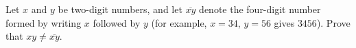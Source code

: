 Let $x$ and $y$ be two-digit numbers, and let $\overline{xy}$ denote the four-digit number formed by writing $x$ followed by $y$ (for example, $x=34$, $y=56$ gives $3456$). Prove that $xy\ne\overline{xy}$.

